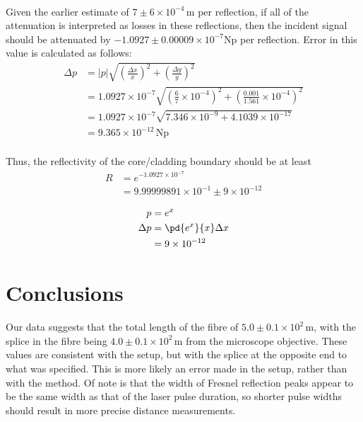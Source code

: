 \paragraph*{}
Given the earlier estimate of $7 \pm 6 \times 10^{-4} \, \text{m}$ per reflection,
if all of the attenuation is interpreted as losses in these reflections, then the incident signal should be attenuated by $-1.0927 \pm 0.00009 \times 10^{-7} \text{Np}$ per reflection. Error in this value is calculated as follows:
\begin{align*}
	\Delta p &= |p| \sqrt{\left(\frac{\Delta x}{x}\right)^2 + \left(\frac{\Delta y}{y}\right)^2}\\
	&= 1.0927 \times 10^{-7} \sqrt{\left(\frac{6}{7} \times 10^{-4}\right)^2 + \left(\frac{0.001}{1.561} \times 10^{-4}\right)^2}	\\
	&= 1.0927 \times 10^{-7} \sqrt{7.346 \times 10^{-9} + 4.1039 \times 10^{-17}}	\\
	&= 9.365 \times 10^{-12} \,\text{Np}	\\
\end{align*}

Thus, the reflectivity of the core/cladding boundary should be at least
\begin{align*}
	R &= e^{-1.0927 \times 10^{-7}}	\\
		&= 9.99999891 \times 10^{-1} \pm 9 \times 10^{-12}
\end{align*}

\begin{align*}
	p &= e^{x}	\\
	\Delta p &= \pd{e^{x}}{x} \Delta x	\\
		&= 9 \times 10^{-12}
\end{align*}
\section{Conclusions}
Our data suggests that the total length of the fibre of $5.0 \pm 0.1 \times 10^{2} \,\text{m}$, with the splice in the fibre being $4.0 \pm 0.1 \times 10^{2} \,\text{m}$ from the microscope objective. These values are consistent with the setup, but with the splice at the opposite end to what was specified. This is more likely an error made in the setup, rather than with the method.
Of note is that the width of Fresnel reflection peaks appear to be the same width as that of the laser pulse duration, so shorter pulse widths should result in more precise distance measurements.

